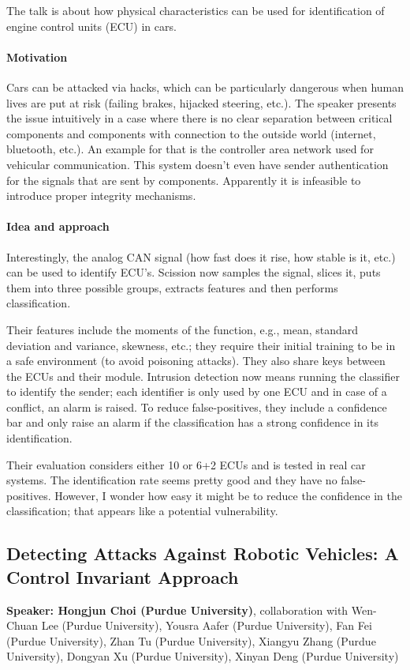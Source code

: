 \documentclass{article}
\begin{document}
The talk is about how physical characteristics can be used for identification of engine control units (ECU) in cars.

\paragraph{Motivation}
Cars can be attacked via hacks, which can be particularly dangerous when human lives are put at risk (failing brakes, hijacked steering, etc.). The speaker presents the issue intuitively in a case where there is no clear separation between critical components and components with connection to the outside world (internet, bluetooth, etc.). An example for that is the controller area network used for vehicular communication. This system doesn't even have sender authentication for the signals that are sent by components. Apparently it is infeasible to introduce proper integrity mechanisms.

\paragraph{Idea and approach}
Interestingly, the analog CAN signal (how fast does it rise, how stable is it, etc.) can be used to identify ECU's. Scission now samples the signal, slices it, puts them into three possible groups, extracts features and then performs classification.

Their features include the moments of the function, e.g., mean, standard deviation and variance, skewness, etc.; they require their initial training to be in a safe environment (to avoid poisoning attacks). They also share keys between the ECUs and their module. Intrusion detection now means running the classifier to identify the sender; each identifier is only used by one ECU and in case of a conflict, an alarm is raised. To reduce false-positives, they include a confidence bar and only raise an alarm if the classification has a strong confidence in its identification. 

Their evaluation considers either 10 or 6+2 ECUs and is tested in real car systems. The identification rate seems pretty good and they have no false-positives. However, I wonder how easy it might be to reduce the confidence in the classification; that appears like a potential vulnerability.

\subsection{Detecting Attacks Against Robotic Vehicles: A Control Invariant Approach}
\noindent\textbf{Speaker: Hongjun Choi (Purdue University)}, collaboration with Wen-Chuan Lee (Purdue University), Yousra Aafer (Purdue University), Fan Fei (Purdue University), Zhan Tu (Purdue University), Xiangyu Zhang (Purdue University), Dongyan Xu (Purdue University), Xinyan Deng (Purdue University)\\
\end{document}

